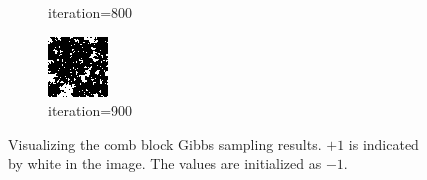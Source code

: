 \documentclass{article}
\begin{document}
\begin{figure}[h]
\begin{subfigure}[t]{0.18\textwidth}
\vspace{-0.6cm}
\caption{iteration=800}
\end{subfigure}\hspace{0.01\textwidth}
\begin{subfigure}[t]{0.18\textwidth}
\centering
\includegraphics[width=\textwidth]{./computational/results/gibbs_comb_sampler_negative_iter_900.png}
\vspace{-0.6cm}
\caption{iteration=900}
\end{subfigure}\hspace{0.01\textwidth}
\caption{Visualizing the comb block Gibbs sampling results. $+1$ is indicated by white in the image. The values are initialized as $-1$.}
\label{f:63d}
\end{figure}
%
\end{document}
